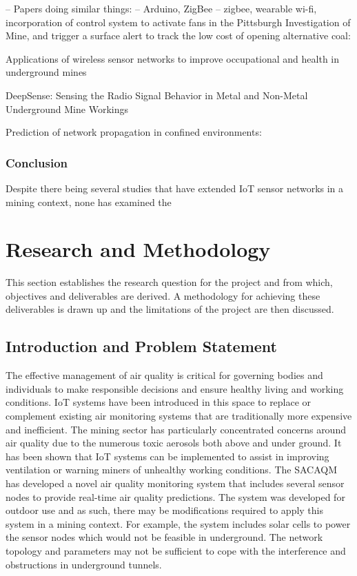 \documentclass[a4paper,twoside,12pt]{report}
\begin{document}
-- Papers doing similar things:
 \cite{Jo_Khan_2018} -- Arduino, ZigBee
 \cite{Zhu2019MonitoringNetwork} -- zigbee, wearable
 wi-fi, incorporation of control system to activate fans in the Pittsburgh Investigation of Mine, and trigger a surface alert to track the low cost of opening alternative coal: \cite{Ali2022ImprovingSystem} 

Applications of wireless sensor networks to improve occupational and health in underground mines \cite{Sadeghi2022ApplicationsMines}

DeepSense: Sensing the Radio Signal Behavior in Metal and Non-Metal Underground Mine Workings \cite{Ranjan2018DeepSense:Workings}

Prediction of network propagation in confined environments:
\citep{MineRadioPredictionModel1}
\citep{MineRadioPredictionModel2}

\subsection{Conclusion}
Despite there being several studies that have extended IoT sensor networks in a mining context, none has examined the 

\chapter{Research and Methodology}
This section establishes the research question for the project and from which, objectives and deliverables are derived. A methodology for achieving these deliverables is drawn up and the limitations of the project are then discussed.

\section{Introduction and Problem Statement}
The effective management of air quality is critical for governing bodies and individuals to make responsible decisions and ensure healthy living and working conditions. IoT systems have been introduced in this space to replace or complement existing air monitoring systems that are traditionally more expensive and inefficient. 
\newline \newline
The mining sector has particularly concentrated concerns around air quality due to the numerous toxic aerosols both above and under ground. It has been shown that IoT systems can be implemented to assist in improving ventilation or warning miners of unhealthy working conditions. 
\newline \newline
The SACAQM has developed a novel air quality monitoring system that includes several sensor nodes to provide real-time air quality predictions. The system was developed for outdoor use and as such, there may be modifications required to apply this system in a mining context. For example, the system includes solar cells to power the sensor nodes which would not be feasible in underground. The network topology and parameters may not be sufficient to cope with the interference and obstructions in underground tunnels.
\end{document}
